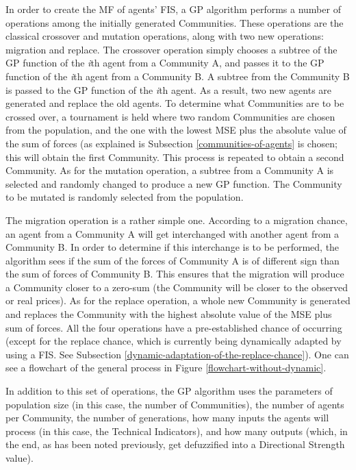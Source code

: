 In order to create the MF of agents' FIS, a GP algorithm performs a number of operations among the initially generated Communities. These operations are the classical crossover and mutation operations, along with two new operations: migration and replace. The crossover operation simply chooses a subtree of the GP function of the \textit{i}th agent from a Community A, and passes it to the GP function of the \textit{i}th agent from a Community B. A subtree from the Community B is passed to the GP function of the \textit{i}th agent. As a result, two new agents are generated and replace the old agents. To determine what Communities are to be crossed over, a tournament is held where two random Communities are chosen from the population, and the one with the lowest MSE plus the absolute value of the sum of forces (as explained is Subsection \ref{communities-of-agents} is chosen; this will obtain the first Community. This process is repeated to obtain a second Community. As for the mutation operation, a subtree from a Community A is selected and randomly changed to produce a new GP function. The Community to be mutated is randomly selected from the population.

The migration operation is a rather simple one. According to a migration chance, an agent from a Community A will get interchanged with another agent from a Community B. In order to determine if this interchange is to be performed, the algorithm sees if the sum of the forces of Community A is of different sign than the sum of forces of Community B. This ensures that the migration will produce a Community closer to a zero-sum (the Community will be closer to the observed or real prices). As for the replace operation, a whole new Community is generated and replaces the Community with the highest absolute value of the MSE plus sum of forces. All the four operations have a pre-established chance of occurring (except for the replace chance, which is currently being dynamically adapted by using a FIS. See Subsection \ref{dynamic-adaptation-of-the-replace-chance}). One can see a flowchart of the general process in Figure \ref{flowchart-without-dynamic}.

In addition to this set of operations, the GP algorithm uses the parameters of population size (in this case, the number of Communities), the number of agents per Community, the number of generations, how many inputs the agents will process (in this case, the Technical Indicators), and how many outputs (which, in the end, as has been noted previously, get defuzzified into a Directional Strength value).

